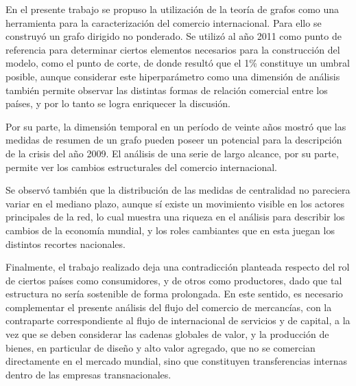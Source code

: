 \documentclass[a4paper]{article}
\begin{document}
En el presente trabajo se propuso la utilización de la teoría de grafos como una herramienta para la caracterización del comercio internacional. Para ello se construyó un grafo dirigido no ponderado.  Se utilizó al año 2011 como punto de referencia para determinar ciertos elementos necesarios para la construcción del modelo, como el punto de corte, de donde resultó que el 1\% constituye un umbral posible, aunque considerar este hiperparámetro como una dimensión de análisis también permite observar las distintas formas de relación comercial entre los países, y por lo tanto se logra enriquecer la discusión. 
\par
Por su parte, la dimensión temporal en un período de veinte años mostró que las medidas de resumen de un grafo pueden poseer un potencial para la descripción de la crisis del año 2009. El análisis de una serie de largo alcance, por su parte, permite ver los cambios estructurales del comercio internacional.            

Se observó también que la distribución de las medidas de centralidad no pareciera variar en el mediano plazo, aunque sí existe un movimiento visible en los actores principales de la red, lo cual muestra una riqueza en el análisis para describir los cambios de la economía mundial, y los roles cambiantes que en esta juegan los distintos recortes nacionales. 

Finalmente, el trabajo realizado deja una contradicción planteada respecto del rol de ciertos países como consumidores, y de otros como productores, dado que tal estructura no sería sostenible de forma prolongada. En este sentido, es necesario complementar el presente análisis del flujo del comercio de mercancías, con la contraparte correspondiente al flujo de internacional de servicios y de capital, a la vez que se deben considerar las cadenas globales de valor, y la producción de bienes, en particular de diseño y alto valor agregado, que no se comercian directamente en el mercado mundial, sino que constituyen transferencias internas dentro de las empresas transnacionales.




\end{document}
